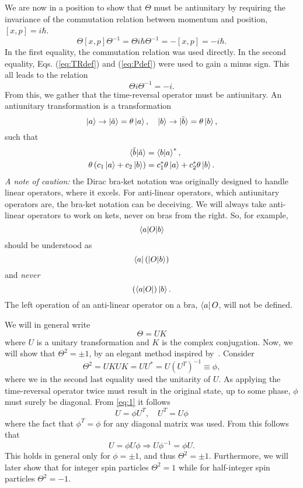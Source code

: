 We are now in a position to show that $\Theta$ must be antiunitary by requiring the invariance of the commutation relation between momentum and position, $[x, p] = i\hbar$.
\begin{equation}
  \Theta [x, p] \Theta^{-1} = \Theta i\hbar \Theta^{-1} = - [x, p] = -i\hbar.
\end{equation}
In the first equality, the commutation relation was used directly.
In the second equality, Eqs. (\ref{eq:TRdef}) and (\ref{eq:Pdef}) were used to gain a minus sign.
This all leads to the relation
\begin{equation}
  \Theta i \Theta^{-1} = -i.
\end{equation}
From this, we gather that the time-reversal operator must be antiunitary.
An antiunitary transformation is a transformation
$$
\ket{a} \rightarrow \ket{\tilde{a}} = \theta \ket{a}, \quad 
\ket{b} \rightarrow \ket{\tilde{b}} = \theta \ket{b},
$$
such that
\begin{align}
  \braket{\tilde{b} | \tilde{a}} &= \braket{b | a}^*,\\
  \theta\left(c_1 \ket{a} + c_2 \ket{b}\right) &= c_1^* \theta\ket{a} + c_2^* \theta\ket{b}.
\end{align}
\emph{A note of caution:} the Dirac bra-ket notation was originally designed to handle linear operators, where it excels.
For anti-linear operators, which antiunitary operators are, the bra-ket notation can be deceiving.
We will always take anti-linear operators to work on kets, never on bras from the right.
So, for example,
$$ \braket{a| O | b} $$
should be understood as
$$ \bra{a} \left(\ket{O |b}\right)$$
and \emph{never}
$$ \left(\bra{a|O}\right) \ket{b}.$$
The left operation of an anti-linear operator on a bra, $\bra{a} O$, will not be defined.

We will in general write
\begin{equation}
  \label{eq:time-rev-def}
  \Theta = U K
\end{equation}
where $U$ is a unitary transformation and $K$ is the complex conjugation.
Now, we will show that $\Theta^2 = \pm 1$, by an elegant method inspired by~\textcite{bernevigTopologicalInsulatorsTopological2013}.
Consider
\begin{equation}
  \label{eq:1}
  \Theta^2 = UKUK = UU^* = U(U^T)^{-1} \equiv \phi,
\end{equation}
where we in the second last equality used the unitarity of $U$.
As applying the time-reversal operator twice must result in the original state, up to some phase, $\phi$ must surely be diagonal.
From \cref{eq:1} it follows
\begin{equation}
  U = \phi U^T, \quad U^T = U \phi
\end{equation}
where the fact that $\phi^T = \phi$ for any diagonal matrix was used.
From this follows that
\begin{equation}
  U = \phi U \phi \Rightarrow U \phi^{-1} = \phi U.
\end{equation}
This holds in general only for $\phi = \pm 1$, and thus $\Theta^2 = \pm 1$.
Furthermore, we will later show that for integer spin particles $\Theta^2 = 1$ while for half-integer spin particles $\Theta^2 = -1$.

